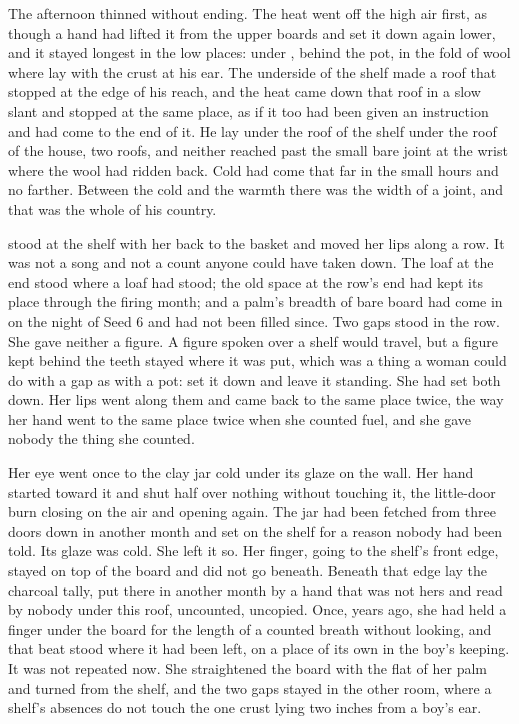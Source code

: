 The afternoon thinned without ending. The heat went off the high air first, as though a hand had lifted it from the upper boards and set it down again lower, and it stayed longest in the low places: under , behind the pot, in the fold of wool where  lay with the crust at his ear. The underside of the shelf made a roof that stopped at the edge of his reach, and the heat came down that roof in a slow slant and stopped at the same place, as if it too had been given an instruction and had come to the end of it. He lay under the roof of the shelf under the roof of the house, two roofs, and neither reached past the small bare joint at the wrist where the wool had ridden back. Cold had come that far in the small hours and no farther. Between the cold and the warmth there was the width of a joint, and that was the whole of his country.

 stood at the shelf with her back to the basket and moved her lips along a row. It was not a song and not a count anyone could have taken down. The loaf at the end stood where a loaf had stood; the old space at the row's end had kept its place through the firing month; and a palm's breadth of bare board had come in on the night of Seed 6 and had not been filled since. Two gaps stood in the row. She gave neither a figure. A figure spoken over a shelf would travel, but a figure kept behind the teeth stayed where it was put, which was a thing a woman could do with a gap as with a pot: set it down and leave it standing. She had set both down. Her lips went along them and came back to the same place twice, the way her hand went to the same place twice when she counted fuel, and she gave nobody the thing she counted.

Her eye went once to the clay jar cold under its glaze on the wall. Her hand started toward it and shut half over nothing without touching it, the little-door burn closing on the air and opening again. The jar had been fetched from three doors down in another month and set on the shelf for a reason nobody had been told. Its glaze was cold. She left it so. Her finger, going to the shelf's front edge, stayed on top of the board and did not go beneath. Beneath that edge lay the charcoal tally, put there in another month by a hand that was not hers and read by nobody under this roof, uncounted, uncopied. Once, years ago, she had held a finger under the board for the length of a counted breath without looking, and that beat stood where it had been left, on a place of its own in the boy's keeping. It was not repeated now. She straightened the board with the flat of her palm and turned from the shelf, and the two gaps stayed in the other room, where a shelf's absences do not touch the one crust lying two inches from a boy's ear.

